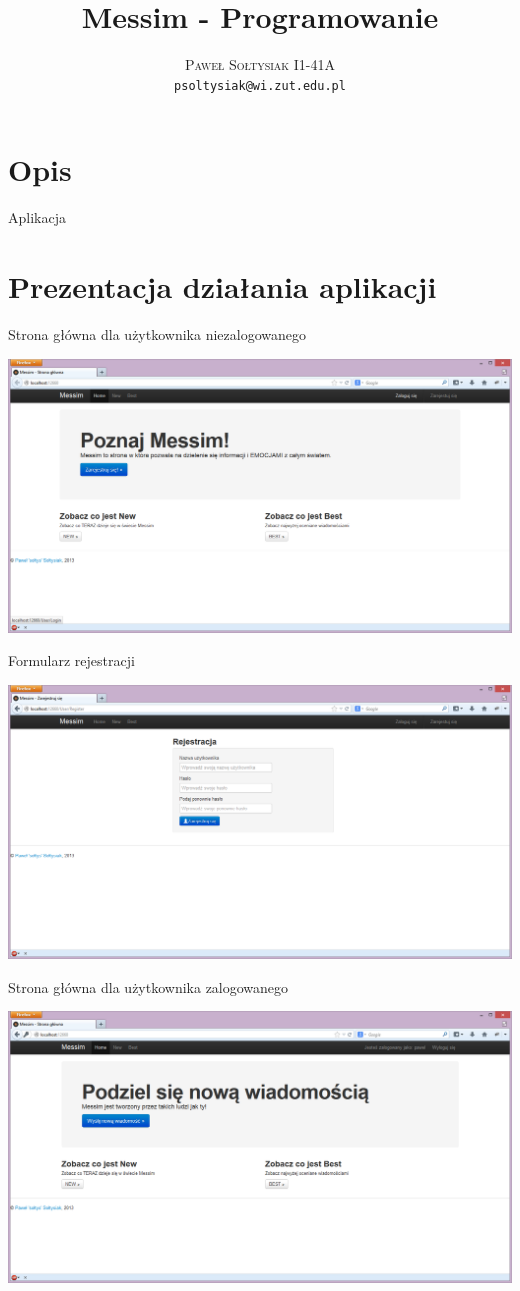 \documentclass{article}
\title{Messim - Programowanie }
\author{\textsc{Paweł Sołtysiak I1-41A} \\ \texttt{psoltysiak@wi.zut.edu.pl}}
\begin{document}
\maketitle

\section{Opis}
Aplikacja 
\section{Prezentacja działania aplikacji}
Strona główna dla użytkownika niezalogowanego

\includegraphics[width=\textwidth]{screenshots/home_page_not_singup}

Formularz rejestracji

\includegraphics[width=\textwidth]{screenshots/register_page}

Strona główna dla użytkownika zalogowanego

\includegraphics[width=\textwidth]{screenshots/home_page_with_user}
\end{document}
